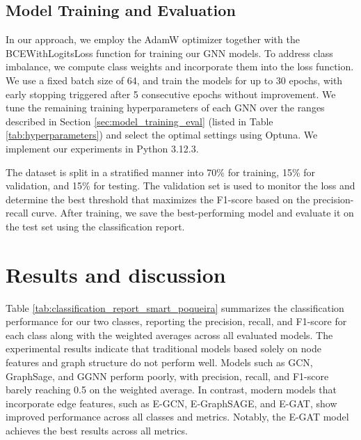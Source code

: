\documentclass[journal]{IEEEtran}
\begin{document}
\subsection{Model Training and Evaluation}

In our approach, we employ the AdamW optimizer \cite{loshchilov2017decoupled} together with the BCEWithLogitsLoss function \cite{paszke2019pytorch} for training our GNN models. To address class imbalance, we compute class weights and incorporate them into the loss function. We use a fixed batch size of 64, and train the models for up to 30 epochs, with early stopping triggered after 5 consecutive epochs without improvement. We tune the remaining training hyperparameters of each GNN over the ranges described in Section \ref{sec:model_training_eval} (listed in Table \ref{tab:hyperparameters}) and select the optimal settings using Optuna. We implement our experiments in Python 3.12.3.

The dataset is split in a stratified manner into 70\% for training, 15\% for validation, and 15\% for testing. The validation set is used to monitor the loss and determine the best threshold that maximizes the F1-score based on the precision-recall curve. After training, we save the best-performing model and evaluate it on the test set using the classification report.



\section{Results and discussion} \label{sec:results_discussion}

Table \ref{tab:classification_report_smart_poqueira} summarizes the classification performance for our two classes, reporting the precision, recall, and F1-score for each class along with the weighted averages across all evaluated models. The experimental results indicate that traditional models based solely on node features and graph structure do not perform well. Models such as GCN, GraphSage, and GGNN perform poorly, with precision, recall, and F1-score barely reaching 0.5 on the weighted average. In contrast, modern models that incorporate edge features, such as E-GCN, E-GraphSAGE, and E-GAT, show improved performance across all classes and metrics. Notably, the E-GAT model achieves the best results across all metrics.
\end{document}
